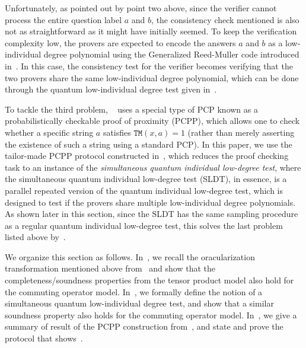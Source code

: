 Unfortunately, as pointed out by point two above, since the verifier cannot process the entire question label $a$ and $b$, the consistency check mentioned is also not as straightforward as it might have initially seemed. To keep the verification complexity low, the provers are expected to encode the answers $a$ and $b$ as a low-individual degree polynomial using the Generalized Reed-Muller code introduced in~. In this case, the consistency test for the verifier becomes verifying that the two provers share the same low-individual degree polynomial, which can be done through the quantum low-individual degree test given in~. 

To tackle the third problem, ~\cite{natarajanNEEXPMIP2019a} uses a special type of PCP known as a probabilistically checkable proof of proximity (PCPP), which allows one to check whether a specific string $a$ satisfies $\texttt{TM}(x,a)=1$ (rather than merely asserting the existence of such a string using a standard PCP). In this paper, we use the tailor-made PCPP protocol constructed in~\cite[Section 10]{jiMIPRE2022a}, which reduces the proof checking task to an instance of the \emph{simultaneous quantum individual low-degree test}, where the simultaneous quantum individual low-degree test (SLDT), in essence, is a parallel repeated version of the quantum individual low-degree test, which is designed to test if the provers share multiple low-individual degree polynomials.  As shown later in this section, since the SLDT has the same sampling procedure as a regular quantum individual low-degree test, this solves the last problem listed above by~. 

We organize this section as follows. In~, we recall the oracularization transformation mentioned above from~\cite[Section 9]{jiMIPRE2022a} and show that the completeness/soundness properties from the tensor product model also hold for the commuting operator model. In~, we formally define the notion of a simultaneous quantum low-individual degree test, and show that a similar soundness  property also holds for the commuting operator model. In~, we give a summary of result of the PCPP construction from~\cite[Section 10]{jiMIPRE2022a}, and state and prove the protocol that shows~. 


 



